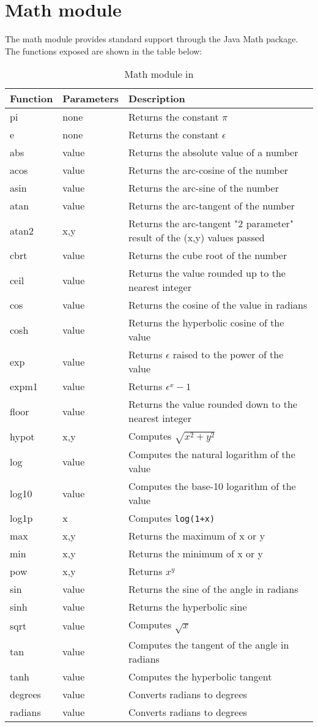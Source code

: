 \section{Math module}
The math module provides standard support through the Java Math package. The functions exposed are shown in the table below:
\begin{table}[!h]
  \small
\centering
\begin{tabular} { | l | l | p{9cm}  | }
\hline
Function  & Parameters & Description   \\
\hline
pi & none & Returns the constant $\pi$   \\
e & none & Returns the constant $\epsilon$   \\
abs & value & Returns the absolute value of a number  \\
acos & value & Returns the arc-cosine of the number \\
asin & value & Returns the arc-sine of the number \\
atan & value & Returns the arc-tangent of the number \\
atan2 & x,y & Returns the arc-tangent "2 parameter" result of the (x,y) values passed \\
cbrt & value & Returns the cube root of the number \\
ceil & value & Returns the value rounded up to the nearest integer \\
cos & value & Returns the cosine of the value in radians \\
cosh & value & Returns the hyperbolic cosine of the value \\
exp & value & Returns $\epsilon$ raised to the power of the value \\
expm1 & value & Returns $\epsilon^x - 1 $ \\
floor & value & Returns the value rounded down to the nearest integer \\
hypot & x,y & Computes $ \sqrt { x^2 + y^2 } $ \\
log & value & Computes the natural logarithm of the value \\
log10 & value & Computes the base-10 logarithm of the value \\
log1p & x & Computes \Verb^log(1+x)^ \\
max & x,y & Returns the maximum of x or y \\
min & x,y & Returns the minimum of x or y \\
pow & x,y & Returns $x^y$ \\
sin & value & Returns the sine of the angle in radians \\
sinh & value & Returns the hyperbolic sine \\
sqrt & value & Computes $\sqrt x $ \\
tan & value & Computes the tangent of the angle in radians \\
tanh & value & Computes the hyperbolic tangent \\
degrees & value & Converts radians to degrees \\
radians & value & Converts radians to degrees \\
\hline
\end{tabular}
\caption{Math module in \Reflex}
\end{table}

